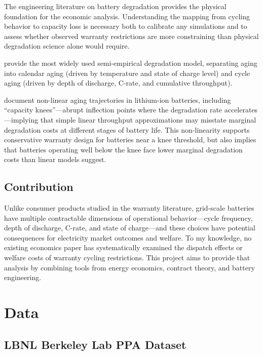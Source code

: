 \documentclass[12pt]{article}
\begin{document}
The engineering literature on battery degradation provides the physical foundation for the economic analysis. Understanding the mapping from cycling behavior to capacity loss is necessary both to calibrate any simulations and to assess whether observed warranty restrictions are more constraining than physical degradation science alone would require.

\citet{xu2018} provide the most widely used semi-empirical degradation model, separating aging into calendar aging (driven by temperature and state of charge level) and cycle aging (driven by depth of discharge, C-rate, and cumulative throughput). 

\citet{attia2022} document non-linear aging trajectories in lithium-ion batteries, including ``capacity knees''---abrupt inflection points where the degradation rate accelerates---implying that simple linear throughput approximations may misstate marginal degradation costs at different stages of battery life. This non-linearity supports conservative warranty design for batteries near a knee threshold, but also implies that batteries operating well below the knee face lower marginal degradation costs than linear models suggest. 

\subsection{Contribution}

Unlike consumer products studied in the warranty literature, grid-scale batteries have multiple contractable dimensions of operational behavior---cycle frequency, depth of discharge, C-rate, and state of charge---and these choices have potential consequences for electricity market outcomes and welfare. To my knowledge, no existing economics paper has systematically examined the dispatch effects or welfare costs of warranty cycling restrictions. This project aims to provide that analysis by combining tools from energy economics, contract theory, and battery engineering.


\section{Data}

\subsection{LBNL Berkeley Lab PPA Dataset}
\end{document}
